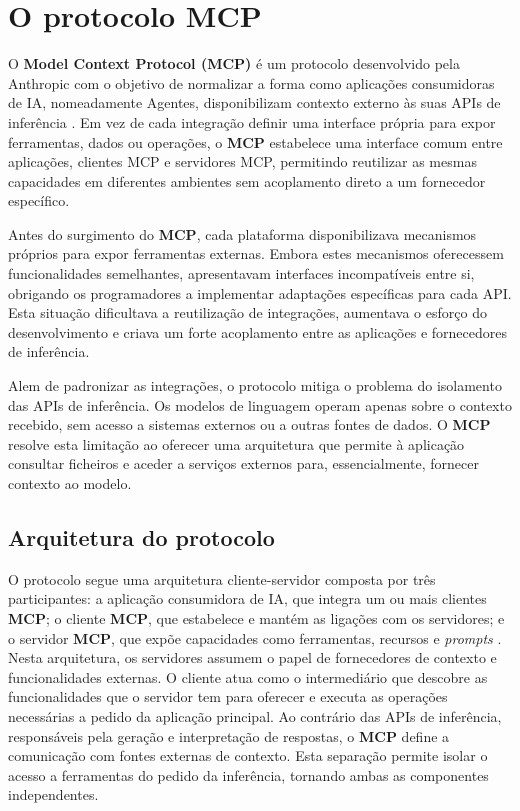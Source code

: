 \section{O protocolo MCP}

O \textbf{Model Context Protocol (MCP)} é um protocolo desenvolvido pela
Anthropic com o objetivo de normalizar a forma como aplicações consumidoras de IA, nomeadamente Agentes, disponibilizam
contexto externo às suas APIs de inferência \cite{mcp_intro}. Em vez de cada
integração definir uma interface própria para expor ferramentas, dados ou operações, o
\textbf{MCP} estabelece uma interface comum entre aplicações, clientes MCP e
servidores MCP, permitindo reutilizar as mesmas capacidades em diferentes ambientes
sem acoplamento direto a um fornecedor específico.

Antes do surgimento do \textbf{MCP}, cada plataforma disponibilizava mecanismos
próprios para expor ferramentas externas. Embora estes
mecanismos oferecessem funcionalidades semelhantes, apresentavam interfaces
incompatíveis entre si, obrigando os programadores a implementar adaptações
específicas para cada API. Esta situação dificultava a reutilização de integrações,
aumentava o esforço do desenvolvimento e criava um forte acoplamento entre as
aplicações e fornecedores de inferência.

Alem de padronizar as integrações, o protocolo mitiga o problema do isolamento das APIs de inferência. Os modelos de linguagem operam apenas sobre o contexto recebido, sem acesso a sistemas externos ou a outras fontes de dados. O \textbf{MCP} resolve esta limitação ao oferecer uma arquitetura que permite à aplicação consultar ficheiros e aceder a serviços externos para, essencialmente, fornecer contexto ao modelo.

\subsection{Arquitetura do protocolo}

O protocolo segue uma arquitetura cliente-servidor composta por três participantes: a aplicação consumidora de IA, que integra um ou mais clientes \textbf{MCP}; o cliente \textbf{MCP}, que estabelece e mantém as ligações com os servidores; e o servidor \textbf{MCP}, que expõe capacidades como ferramentas, recursos e \textit{prompts} \cite{mcp_architecture,mcp_server_concepts,mcp_client_concepts}. Nesta arquitetura, os servidores assumem o papel de fornecedores de contexto e funcionalidades externas. O cliente atua como o intermediário que descobre as funcionalidades que o servidor tem para oferecer e executa as operações necessárias a pedido da aplicação principal. Ao contrário das APIs de inferência, responsáveis pela geração e interpretação de respostas, o \textbf{MCP} define a comunicação com fontes externas de contexto. Esta separação permite isolar o acesso a ferramentas do pedido da inferência, tornando ambas as componentes independentes.

